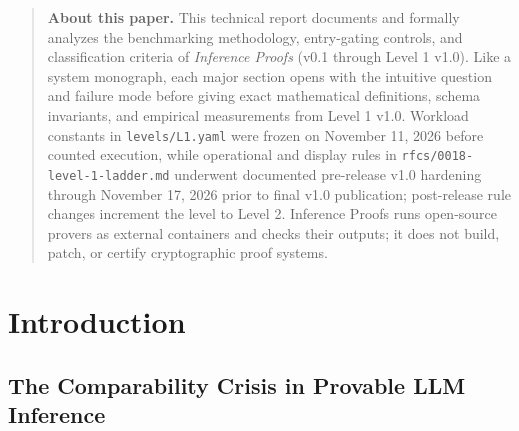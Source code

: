 \documentclass[11pt,letterpaper]{article}
\begin{document}
\begin{abstract}
Request (PR) \#36 (\texttt{4f4166729743}, disclosed as a provisional v1.0 exception after upstream \texttt{eb95bfa} refused slot 1) on Llama 3.1 8B (\texttt{54,453$\times$} steady and \texttt{62,161$\times$} whole-session cost multiple, clearing \texttt{SI-4a} via a \texttt{read as} statement reading with \texttt{level\_\allowbreak{}statement.\allowbreak{}reading = true}), while 5 of 6 non-trivial statement petals across the two rows carry \texttt{GL-10} reading notes. Together, these results resolve order-of-magnitude headline discrepancies, diagnose six empirical failure post-mortems, audit estimator, cryptographic, and formal-verification edge cases, and establish concrete technical and institutional requirements for Level 2.

\medskip\noindent\textbf{Keywords:} provable inference, zero-knowledge machine learning, systems benchmarking, cryptographic classification criteria, non-parametric fidelity testing, formal verification, reproducibility
\end{abstract}

\begin{quote}
\small \textbf{About this paper.} This technical report documents and formally analyzes the benchmarking methodology, entry-gating controls, and classification criteria of \textit{Inference Proofs} (v0.1 through Level 1 v1.0). Like a system monograph, each major section opens with the intuitive question and failure mode before giving exact mathematical definitions, schema invariants, and empirical measurements from Level 1 v1.0. Workload constants in \texttt{levels/\allowbreak{}L1.\allowbreak{}yaml} were frozen on November 11, 2026 before counted execution, while operational and display rules in \texttt{rfcs/\allowbreak{}0018-\allowbreak{}level-1-\allowbreak{}ladder.\allowbreak{}md} underwent documented pre-release v1.0 hardening through November 17, 2026 prior to final v1.0 publication; post-release rule changes increment the level to Level 2. Inference Proofs runs open-source provers as external containers and checks their outputs; it does not build, patch, or certify cryptographic proof systems.
\end{quote}

\tableofcontents
\bigskip
\section{Introduction}

\subsection{The Comparability Crisis in Provable LLM Inference}
\end{document}
